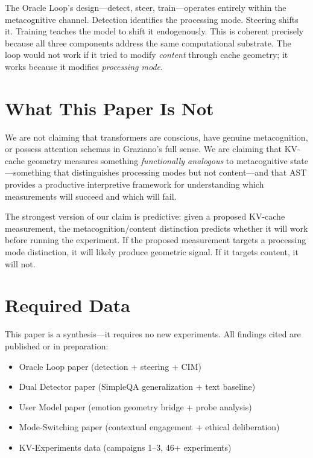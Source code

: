 \documentclass[11pt,letterpaper]{article}
\begin{document}
The Oracle Loop's design---detect, steer, train---operates entirely
within the metacognitive channel. Detection identifies the processing
mode. Steering shifts it. Training teaches the model to shift it
endogenously. This is coherent precisely because all three components
address the same computational substrate. The loop would not work if
it tried to modify \emph{content} through cache geometry; it works
because it modifies \emph{processing mode}.

\section{What This Paper Is Not}

We are not claiming that transformers are conscious, have genuine
metacognition, or possess attention schemas in Graziano's full sense.
We are claiming that KV-cache geometry measures something
\emph{functionally analogous} to metacognitive state---something that
distinguishes processing modes but not content---and that AST provides
a productive interpretive framework for understanding which
measurements will succeed and which will fail.

The strongest version of our claim is predictive: given a proposed
KV-cache measurement, the metacognition/content distinction
predicts whether it will work before running the experiment. If the
proposed measurement targets a processing mode distinction, it will
likely produce geometric signal. If it targets content, it will not.

\section{Required Data}

This paper is a synthesis---it requires no new experiments. All
findings cited are published or in preparation:

\begin{itemize}[nosep]
\item Oracle Loop paper (detection + steering + CIM)
\item Dual Detector paper (SimpleQA generalization + text baseline)
\item User Model paper (emotion geometry bridge + probe analysis)
\item Mode-Switching paper (contextual engagement + ethical deliberation)
\item KV-Experiments data (campaigns 1--3, 46+ experiments)
\end{itemize}
\end{document}
